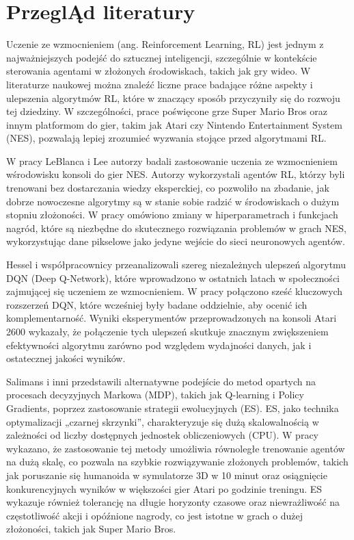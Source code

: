 \chapter[Przegląd literatury]{PrzeglĄd literatury}
\label{chap:przeglad}
Uczenie ze wzmocnieniem (ang. Reinforcement Learning, RL) jest jednym z najważniejszych podejść do sztucznej inteligencji, szczególnie w kontekście sterowania agentami w złożonych środowiskach, takich jak gry wideo. W literaturze naukowej można znaleźć liczne prace badające różne aspekty i ulepszenia algorytmów RL, które w znaczący sposób przyczyniły się do rozwoju tej dziedziny. W szczególności, prace poświęcone grze Super Mario Bros oraz innym platformom do gier, takim jak Atari czy Nintendo Entertainment System (NES), pozwalają lepiej zrozumieć wyzwania stojące przed algorytmami RL.

W pracy LeBlanca i Lee \cite{NES} autorzy badali zastosowanie uczenia ze wzmocnieniem wśrodowisku konsoli do gier NES. Autorzy wykorzystali agentów RL, którzy byli trenowani bez dostarczania wiedzy eksperckiej, co pozwoliło na zbadanie, jak dobrze nowoczesne algorytmy są w stanie sobie radzić w środowiskach o dużym stopniu złożoności. W pracy omówiono zmiany w hiperparametrach i funkcjach nagród, które są niezbędne do skutecznego rozwiązania problemów w grach NES, wykorzystując dane pikselowe jako jedyne wejście do sieci neuronowych agentów.

Hessel i współpracownicy \cite{RAI} przeanalizowali szereg niezależnych ulepszeń algorytmu DQN (Deep Q-Network), które wprowadzono w ostatnich latach w społeczności zajmującej się uczeniem ze wzmocnieniem. W pracy połączono sześć kluczowych rozszerzeń DQN, które wcześniej były badane oddzielnie, aby ocenić ich komplementarność. Wyniki eksperymentów przeprowadzonych na konsoli Atari 2600 wykazały, że połączenie tych ulepszeń skutkuje znacznym zwiększeniem efektywności algorytmu zarówno pod względem wydajności danych, jak i ostatecznej jakości wyników.

Salimans i inni \cite{EV} przedstawili alternatywne podejście do metod opartych na procesach decyzyjnych Markowa (MDP), takich jak Q-learning i Policy Gradients, poprzez zastosowanie strategii ewolucyjnych (ES). ES, jako technika optymalizacji „czarnej skrzynki”, charakteryzuje się dużą skalowalnością w zależności od liczby dostępnych jednostek obliczeniowych (CPU). W pracy wykazano, że zastosowanie tej metody umożliwia równoległe trenowanie agentów na dużą skalę, co pozwala na szybkie rozwiązywanie złożonych problemów, takich jak poruszanie się humanoida w symulatorze 3D w 10 minut oraz osiągnięcie konkurencyjnych wyników w większości gier Atari po godzinie treningu. ES wykazuje również tolerancję na długie horyzonty czasowe oraz niewrażliwość na częstotliwość akcji i opóźnione nagrody, co jest istotne w grach o dużej złożoności, takich jak Super Mario Bros.

